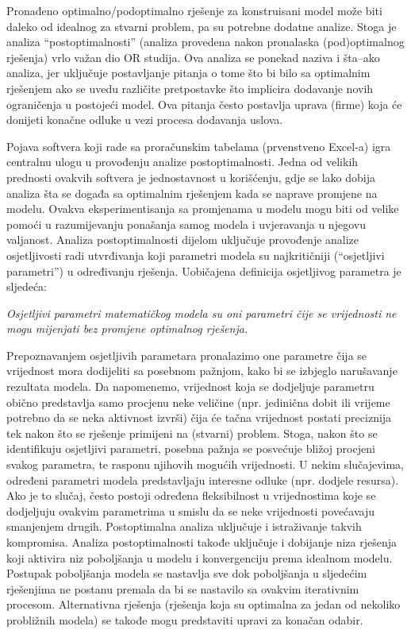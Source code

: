 \documentclass[a4paper, utf8, 11pt, colorlinks]{book}
\begin{document}
Pronađeno optimalno/podoptimalno rješenje za konstruisani model može biti daleko od idealnog za stvarni problem, pa su potrebne dodatne analize. Stoga je analiza ``postoptimalnosti'' (analiza provedena nakon pronalaska (pod)optimalnog rješenja) vrlo važan dio OR studija.  Ova analiza se ponekad naziva i šta--ako analiza, jer uključuje postavljanje pitanja o tome što bi bilo sa optimalnim rješenjem ako se uvedu različite pretpostavke što implicira dodavanje novih ograničenja u postojeći model. Ova pitanja često postavlja uprava (firme) koja će donijeti konačne odluke u vezi procesa dodavanja uslova. %

Pojava softvera koji rade sa proračunskim tabelama (prvenstveno Excel-a) igra centralnu ulogu u provođenju analize postoptimalnosti. Jedna od velikih prednosti ovakvih softvera je jednostavnost u korišćenju, gdje se lako dobija analiza šta se događa sa optimalnim rješenjem kada se naprave promjene na modelu.  Ovakva eksperimentisanja sa promjenama u modelu mogu biti od velike pomoći u razumijevanju ponašanja samog modela i uvjeravanja u njegovu valjanost.  Analiza postoptimalnosti dijelom  uključuje provođenje analize osjetljivosti radi utvrđivanja koji parametri modela su najkritičniji (``osjetljivi parametri'') u određivanju rješenja. Uobičajena definicija osjetljivog parametra je sljedeća:

\emph{Osjetljivi parametri matematičkog modela su oni parametri čije se vrijednosti ne mogu mijenjati bez promjene optimalnog rješenja.}

Prepoznavanjem osjetljivih parametara pronalazimo one parametre čija se vrijednost mora dodijeliti sa posebnom pažnjom, kako bi se izbjeglo narušavanje rezultata modela. Da napomenemo, vrijednost koja se dodjeljuje parametru obično predstavlja samo procjenu neke veličine
(npr. jedinična dobit ili vrijeme potrebno da se neka aktivnost izvrši) čija će tačna vrijednost postati preciznija tek nakon što se rješenje primijeni na (stvarni) problem. Stoga, nakon
što se identifikuju osjetljivi parametri, posebna pažnja se posvećuje bližoj procjeni svakog parametra, te  rasponu njihovih mogućih vrijednosti.  U nekim slučajevima, određeni parametri modela predstavljaju interesne odluke (npr. dodjele resursa). Ako je to slučaj, često postoji određena fleksibilnost u vrijednostima koje se dodjeljuju ovakvim parametrima u smislu da se neke vrijednosti povećavaju smanjenjem drugih. Postoptimalna analiza uključuje i istraživanje takvih kompromisa. Analiza postoptimalnosti takođe uključuje i dobijanje niza rješenja koji aktivira niz poboljšanja u modelu i konvergenciju prema idealnom modelu. Postupak poboljšanja modela se nastavlja sve dok    poboljšanja u sljedećim rješenjima ne postanu premala da bi se nastavilo sa ovakvim iterativnim procesom.   Alternativna rješenja (rješenja koja su optimalna za jedan od nekoliko probližnih modela) se takođe mogu predstaviti upravi za konačan odabir. 
\end{document}
